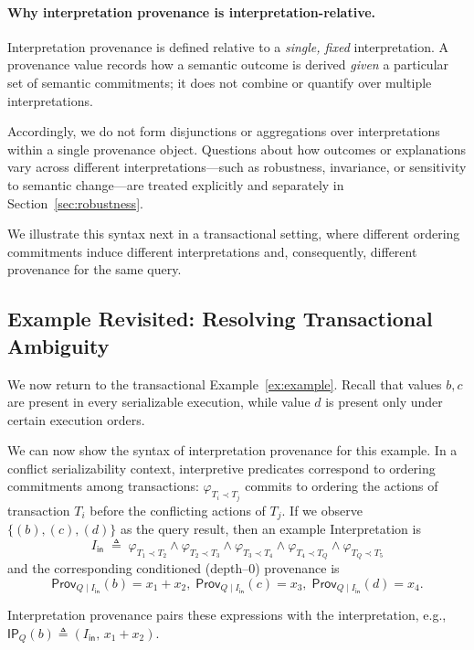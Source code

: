 \documentclass[acmsmall,nonacm]{acmart}
\theoremstyle{remark}
\numberwithin{definition}{section}
\numberwithin{theorem}{section}
\numberwithin{lemma}{section}
\numberwithin{corollary}{section}
\numberwithin{remark}{section}
\numberwithin{example}{section}
\numberwithin{observation}{section}
\numberwithin{assumption}{section}
\newcommand{\Prov}{\mathsf{Prov}}
\begin{document}
\paragraph{Why interpretation provenance is interpretation-relative.}
Interpretation provenance is defined relative to a \emph{single, fixed}
interpretation.
A provenance value records how a semantic outcome is derived \emph{given} a
particular set of semantic commitments; it does not combine or quantify over
multiple interpretations.

Accordingly, we do not form disjunctions or aggregations over interpretations
within a single provenance object.
Questions about how outcomes or explanations vary across different
interpretations—such as robustness, invariance, or sensitivity to semantic
change—are treated explicitly and separately in
Section~\ref{sec:robustness}.

We illustrate this syntax next in a transactional setting, where
different ordering commitments induce different interpretations and,
consequently, different provenance for the same query.

\subsection{Example Revisited: Resolving Transactional Ambiguity}
\label{sec:concurrency}

We now return to the transactional Example~\ref{ex:example}.
Recall that values $b, c$ are present in every serializable execution, while value $d$
is present only under certain execution orders.

We can now show the syntax of interpretation provenance for this example.
In a conflict serializability context, interpretive predicates correspond to ordering
commitments among transactions: $\varphi_{T_i \prec T_j}$ commits to
ordering the actions of transaction $T_i$ before the conflicting actions of $T_j$.
If we observe $\{(b), (c), (d)\}$ as the query result, then an example Interpretation is 
\[
I_{\mathsf{in}} \;\triangleq\; \varphi_{T_1 \prec T_2} \wedge \varphi_{T_2 \prec T_3} \wedge \varphi_{T_3 \prec T_4} \wedge \varphi_{T_4 \prec T_Q} \wedge \varphi_{T_Q \prec T_5}
\]
and the corresponding conditioned (depth--0) provenance is
\[
  \Prov_{Q \mid I_{\mathsf{in}}}(b)=x_1+x_2,\;
  \Prov_{Q \mid I_{\mathsf{in}}}(c)=x_3,\;
  \Prov_{Q \mid I_{\mathsf{in}}}(d)=x_4.
\]

Interpretation provenance pairs these expressions with the interpretation,
e.g., $\mathsf{IP}_Q(b) \triangleq (I_{\mathsf{in}},\, x_1+x_2)$.
\end{document}
